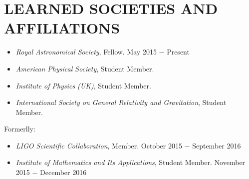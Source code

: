 \section{LEARNED SOCIETIES AND AFFILIATIONS}

\begin{itemize}
\item {\sl Royal Astronomical Society}, Fellow. \hfill May 2015 $-$ Present \\
\item {\sl American Physical Society}, Student Member. \hfill \\
\item {\sl Institute of Physics (UK)}, Student Member. \hfill  \\
\item {\sl International Society on General Relativity and Gravitation}, Student Member. \hfill \\
\end{itemize}
Formerlly: 
\begin{itemize}
\item {\sl LIGO Scientific Collaboration}, Member. \hfill October 2015 $-$ September 2016 \\
\item {\sl Institute of Mathematics and Its Applications}, Student Member. \hfill November 2015 $-$ December 2016\\
\end{itemize}
